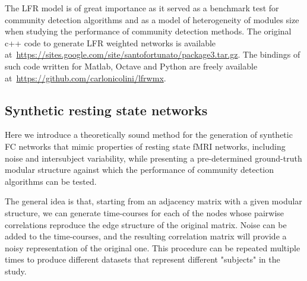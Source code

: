 The LFR model is of great importance as it served as a benchmark test for community detection algorithms and as a model of heterogeneity of modules size when studying the performance of community detection methods. The original c++ code to generate LFR weighted networks is available at~\url{https://sites.google.com/site/santofortunato/package3.tar.gz}. The bindings of such code written for Matlab, Octave and Python are freely available at~\url{https://github.com/carlonicolini/lfrwmx}.


% 


\subsection{Synthetic resting state networks}
Here we introduce a theoretically sound method for the generation of synthetic FC networks that mimic properties of resting state fMRI networks, including noise and intersubject variability, while presenting a pre-determined ground-truth modular structure against which the performance of community detection algorithms can be tested.

The general idea is that, starting from an adjacency matrix with a given modular structure, we can generate time-courses for each of the nodes whose pairwise correlations reproduce the edge structure of the original matrix. Noise can be added to the time-courses, and the resulting correlation matrix will provide a noisy representation of the original one. This procedure can be repeated multiple times to produce different datasets that represent different "subjects" in the study.

